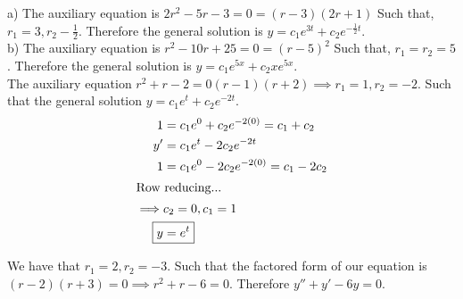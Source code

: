 \documentclass{article}
\begin{document}

\sol
a) The auxiliary equation is $2r^2-5r-3 = 0 = (r-3)(2r+1)$ Such that, $r_1=3, r_2-\frac{1}{2}$.
Therefore the general solution is $\boxed{y= c_1 e^{3t} + c_2 e^{-\frac{1}{2}t}}$. \\
b) The auxiliary equation is $r^2-10r+25 = 0 = (r-5)^2$ Such that, $r_1 = r_2 = 5$. 
Therefore the general solution is $\boxed{y = c_1 e^{5x} + c_2 x e^{5x}}$. \\

\sol The auxiliary equation $r^2 + r -2 = 0 (r-1)(r+2) \implies r_1 = 1, r_2 = -2$.
Such that the general solution $y = c_1 e^{t} + c_2 e^{-2t}$.
\begin{align*}
  1 &= c_1e^0 + c_2e^{-2(0)} = c_1 + c_2 \\
  y' &= c_1e^t - 2c_2e^{-2t} \\
  1 &= c_1e^0 - 2c_2e^{-2(0)} = c_1 - 2c_2 \\
  \intertext{Row reducing...}
  \implies & c_2 = 0, c_1 = 1 \\
  \Aboxed{y &= e^t}
\end{align*}

\sol We have that $r_1 = 2, r_2 = -3$. Such that the factored form of our equation is $(r-2)(r+3) = 0 \implies r^2 + r - 6 = 0$.
Therefore $\boxed{y'' + y' - 6y = 0}$.

\end{document}
